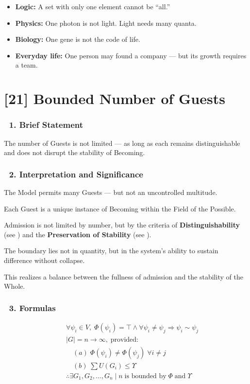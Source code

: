 \documentclass[12pt]{article}
\begin{document}
\begin{itemize}
\item \textbf{Logic:} A set with only one element cannot be ``all.''
\item \textbf{Physics:} One photon is not light. Light needs many quanta.
\item \textbf{Biology:} One gene is not the code of life.
\item \textbf{Everyday life:} One person may found a company — but its growth requires a team.
\end{itemize}


\section*{[21] Bounded Number of Guests}

\subsubsection*{🔹 1. Brief Statement}

The number of Guests is not limited — as long as each remains distinguishable and does not disrupt the stability of Becoming.

\subsubsection*{🔹 2. Interpretation and Significance}

The Model permits many Guests — but not an uncontrolled multitude.

Each Guest is a unique instance of Becoming within the Field of the Possible.

Admission is not limited by number, but by the criteria of \textbf{Distinguishability} (see \text{[5]}) and the \textbf{Preservation of Stability} (see \text{[18]}).

The boundary lies not in quantity, but in the system's ability to sustain difference without collapse.

This realizes a balance between the fullness of admission and the stability of the Whole.

\subsubsection*{🔹 3. Formulas}

\[
\begin{aligned}
& \quad \forall \psi_i \in V, \; \Phi(\psi_i) = \top \land \forall \psi_i \neq \psi_j \Rightarrow \psi_i \sim \psi_j \\
& \quad |G| = n \to \infty, \; \text{provided:} \\
&\qquad (a)\; \Phi(\psi_i) \neq \Phi(\psi_j)\; \forall i \neq j \\
&\qquad (b)\; \sum U(G_i) \leq \Upsilon \\
& \quad \therefore \exists G_1, G_2, ..., G_n \;|\; n\; \text{is bounded by}\; \Phi\; \text{and}\; \Upsilon
\end{aligned}
\]
\end{document}
